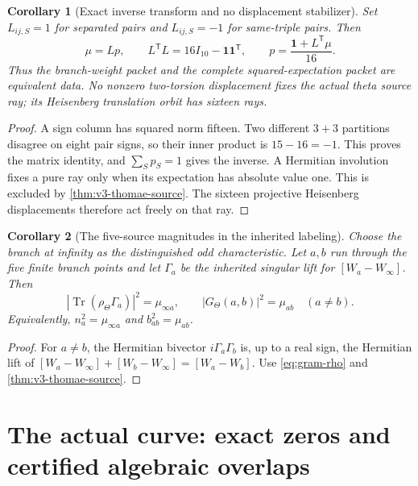 \documentclass[11pt]{article}
\newtheorem{corollary}[corollary]{Corollary}
\theoremstyle{definition}
\theoremstyle{remark}
\newcommand{\Tr}{\operatorname{Tr}}
\newcommand{\one}{\mathbf1}
\begin{document}
\begin{corollary}[Exact inverse transform and no displacement stabilizer]
\label{cor:v3-inverse}
Set $L_{ij,S}=1$ for separated pairs and $L_{ij,S}=-1$ for same-triple
pairs. Then
\begin{equation}
 \mu=Lp,\qquad L^{\mathsf T}L=16I_{10}-\one\one^{\mathsf T},
 \qquad \boxed{p=\frac{\one+L^{\mathsf T}\mu}{16}.}
 \label{eq:v3-inverse}
\end{equation}
Thus the branch-weight packet and the complete squared-expectation packet
are equivalent data. No nonzero two-torsion displacement fixes the actual
theta source ray; its Heisenberg translation orbit has sixteen rays.
\end{corollary}
\begin{proof}
A sign column has squared norm fifteen. Two different $3+3$ partitions
disagree on eight pair signs, so their inner product is $15-16=-1$.
This proves the matrix identity, and $\sum_Sp_S=1$ gives the inverse.
A Hermitian involution fixes a pure ray only when its expectation has
absolute value one. This is excluded by \cref{thm:v3-thomae-source}.
The sixteen projective Heisenberg displacements therefore act freely on
that ray.
\end{proof}

\begin{corollary}[The five-source magnitudes in the inherited labeling]
\label{cor:v3-five-source}
Choose the branch at infinity as the distinguished odd characteristic.
Let $a,b$ run through the five finite branch points and let
$\Gamma_a$ be the inherited singular lift for $[W_a-W_\infty]$.
Then
\begin{equation}
 \boxed{\displaystyle
 |\Tr(\rho_\Theta\Gamma_a)|^2=\mu_{\infty a},\qquad
 |G_\Theta(a,b)|^2=\mu_{ab}\quad(a\ne b).}
 \label{eq:v3-five-source}
\end{equation}
Equivalently, $n_a^2=\mu_{\infty a}$ and $b_{ab}^2=\mu_{ab}$.
\end{corollary}
\begin{proof}
For $a\ne b$, the Hermitian bivector $i\Gamma_a\Gamma_b$ is, up to a
real sign, the Hermitian lift of
$[W_a-W_\infty]+[W_b-W_\infty]=[W_a-W_b]$.
Use \eqref{eq:gram-rho} and \cref{thm:v3-thomae-source}.
\end{proof}

\section{The actual curve: exact zeros and certified algebraic overlaps}
\label{sec:v3-actual-curve}
\end{document}
